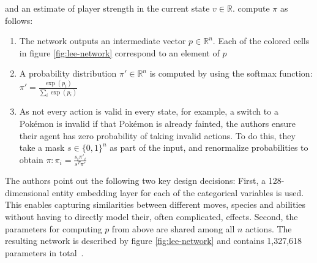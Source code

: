 and an estimate of player strength in the current state $v \in \mathbb{R}$. \cite{Huang_Lee_2019} compute
$\pi$ as follows:
\begin{enumerate}
    \item The network outputs an intermediate vector $p \in \mathbb{R}^n$. Each of the colored cells in
    figure \ref{fig:lee-network} correspond to an element of $p$
    \item A probability distribution $\pi' \in \mathbb{R}^n$ is computed by using the
    softmax function: \\ $\pi' = \frac{\exp(p_i)}{\sum_i \exp(p_i)}$
    \item As not every action is valid in every state, for example, a switch to a Pokémon is invalid
    if that Pokémon is already fainted, the authors ensure their agent has zero probability of taking
    invalid actions. To do this, they take a mask $s \in \{0, 1\}^n$ as part of the input, and 
    renormalize probabilities to obtain $\pi: \pi_i = \frac{s_i \pi'_i}{s^T \pi'}$
\end{enumerate}
The authors point out the following two key design decisions: First, a 128-dimensional entity embedding layer
for each of the categorical variables is used. This enables capturing similarities between different moves,
species and abilities without having to directly model their, often complicated, effects. Second, the
parameters for computing $p$ from above are shared among all $n$ actions. The resulting network is described
by figure \ref{fig:lee-network} and contains 1,327,618 parameters in total~\autocite{Huang_Lee_2019}.

